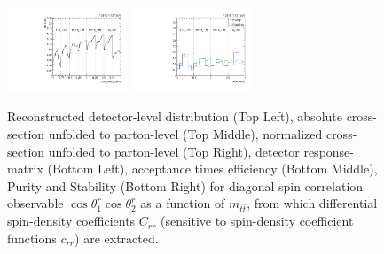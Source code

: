 \begin{figure}[htb]
\begin{center}
 \includegraphics[width=0.32\textwidth]{fig_fullRun2UL/unfolding/combined/TotEff_c_rr_mttbar.pdf}
 \includegraphics[width=0.32\textwidth]{fig_fullRun2UL/unfolding/combined/PurStab_c_rr_mttbar.pdf} \\
\caption{Reconstructed detector-level distribution (Top Left), absolute cross-section unfolded to parton-level (Top Middle), normalized cross-section unfolded to parton-level (Top Right), detector response-matrix (Bottom Left), acceptance times efficiency (Bottom Middle), Purity and Stability (Bottom Right) for diagonal spin correlation observable $\cos\theta_{1}^{r}\cos\theta_{2}^{r}$ as a function of $m_{t\bar{t}}$, from which differential spin-density coefficients $C_{rr}$ (sensitive to spin-density coefficient functions $c_{r r}$) are extracted.}
\label{fig:c_rr_mttbar}
\end{center}
\end{figure}
\clearpage
